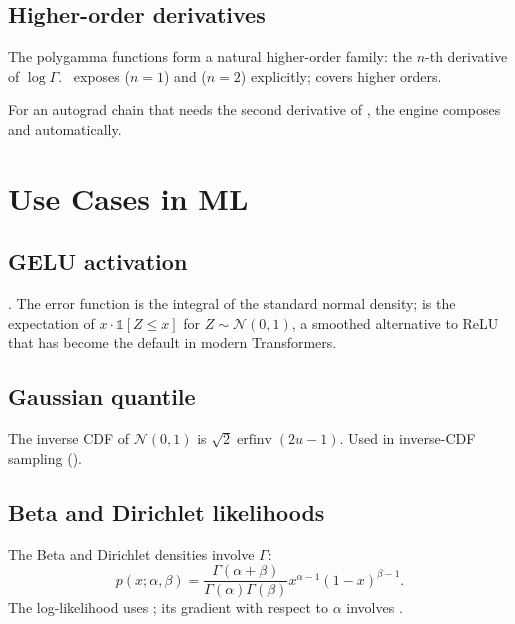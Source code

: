 \subsection{Higher-order derivatives}
\label{ssec:special_functions:higher_order}

The polygamma functions form a natural higher-order family: the
$n$-th derivative of $\log \Gamma$. \Lucid\ exposes 
($n=1$) and  ($n=2$) explicitly; 
covers higher orders.

For an autograd chain that needs the second derivative of
, the engine composes  and
 automatically.

\section{Use Cases in ML}
\label{sec:special_functions:use_cases}

\subsection{GELU activation}
\label{ssec:special_functions:gelu_uc}

. The error
function is the integral of the standard normal density;
 is the expectation of $x \cdot \mathbb{1}[Z \leq
x]$ for $Z \sim \mathcal{N}(0, 1)$, a smoothed alternative to
ReLU that has become the default in modern Transformers.

\subsection{Gaussian quantile}
\label{ssec:special_functions:gauss_quantile}

The inverse CDF of $\mathcal{N}(0, 1)$ is $\sqrt{2}
\operatorname{erfinv}(2u - 1)$. Used in inverse-CDF sampling
().

\subsection{Beta and Dirichlet likelihoods}
\label{ssec:special_functions:beta_lik}

The Beta and Dirichlet densities involve $\Gamma$:
\[
p(x; \alpha, \beta) = \frac{\Gamma(\alpha + \beta)}{\Gamma(\alpha)
\Gamma(\beta)} x^{\alpha - 1} (1 - x)^{\beta - 1}.
\]
The log-likelihood uses ; its gradient with respect
to $\alpha$ involves .

